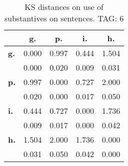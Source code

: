 \begin{table}[h!]
\begin{center}
\begin{tabular}{| l || c | c | c | c |}\hline
 & {\bf g.} & {\bf p.} & {\bf i.} & {\bf h.} \\\hline\hline
{\bf g.} & 0.000 & 0.997 & 0.444 & 1.504 \\
{\bf } & 0.000 & 0.020 & 0.009 & 0.031 \\\hline
{\bf p.} & 0.997 & 0.000 & 0.727 & 2.000 \\
{\bf } & 0.020 & 0.000 & 0.017 & 0.050 \\\hline
{\bf i.} & 0.444 & 0.727 & 0.000 & 1.736 \\
{\bf } & 0.009 & 0.017 & 0.000 & 0.042 \\\hline
{\bf h.} & 1.504 & 2.000 & 1.736 & 0.000 \\
{\bf } & 0.031 & 0.050 & 0.042 & 0.000 \\\hline
\end{tabular}
\caption{KS distances on use of substantives on sentences. TAG: 6}
\end{center}
\end{table}